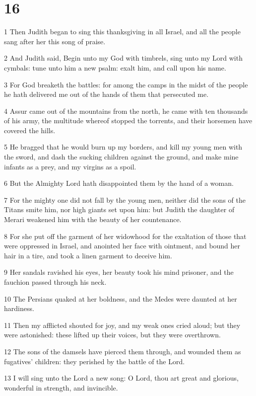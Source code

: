 \chapter{16}

\par 1 Then Judith began to sing this thanksgiving in all Israel, and all the people sang after her this song of praise.
\par 2 And Judith said, Begin unto my God with timbrels, sing unto my Lord with cymbals: tune unto him a new psalm: exalt him, and call upon his name.
\par 3 For God breaketh the battles: for among the camps in the midst of the people he hath delivered me out of the hands of them that persecuted me.
\par 4 Assur came out of the mountains from the north, he came with ten thousands of his army, the multitude whereof stopped the torrents, and their horsemen have covered the hills.
\par 5 He bragged that he would burn up my borders, and kill my young men with the sword, and dash the sucking children against the ground, and make mine infants as a prey, and my virgins as a spoil.
\par 6 But the Almighty Lord hath disappointed them by the hand of a woman.
\par 7 For the mighty one did not fall by the young men, neither did the sons of the Titans smite him, nor high giants set upon him: but Judith the daughter of Merari weakened him with the beauty of her countenance.
\par 8 For she put off the garment of her widowhood for the exaltation of those that were oppressed in Israel, and anointed her face with ointment, and bound her hair in a tire, and took a linen garment to deceive him.
\par 9 Her sandals ravished his eyes, her beauty took his mind prisoner, and the fauchion passed through his neck.
\par 10 The Persians quaked at her boldness, and the Medes were daunted at her hardiness.
\par 11 Then my afflicted shouted for joy, and my weak ones cried aloud; but they were astonished: these lifted up their voices, but they were overthrown.
\par 12 The sons of the damsels have pierced them through, and wounded them as fugatives' children: they perished by the battle of the Lord.
\par 13 I will sing unto the Lord a new song: O Lord, thou art great and glorious, wonderful in strength, and invincible.
